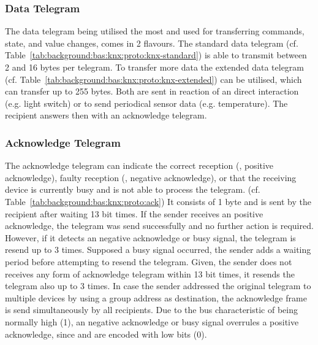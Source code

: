 

\subsubsection{Data Telegram}

The data telegram being utilised the most and used for transferring commands, state, and value changes, comes in 2 flavours.
The standard data telegram (cf. Table~\ref{tab:background:bas:knx:proto:knx-standard}) is able to transmit between 2 and 16 bytes per telegram. To transfer more data the extended data telegram (cf. Table~\ref{tab:background:bas:knx:proto:knx-extended}) can be utilised, which can transfer up to 255 bytes.
Both are sent in reaction of an direct interaction (e.g. light switch) or to send periodical sensor data (e.g. temperature). \parencite{Merz2009}
The recipient answers then with an acknowledge telegram. \parencite{Merz2009,Sokollik2017}





\subsubsection{Acknowledge Telegram}

The acknowledge telegram can indicate the correct reception (, positive acknowledge), faulty reception (, negative acknowledge), or that the receiving device is currently busy and is not able to process the telegram. (cf. Table~\ref{tab:background:bas:knx:proto:ack})
It consists of 1 byte and is sent by the recipient after waiting 13 bit times.
If the sender receives an positive acknowledge, the telegram was send successfully and no further action is required. However, if it detects an negative acknowledge or busy signal, the telegram is resend up to 3 times.
Supposed a busy signal occurred, the sender adds a waiting period before attempting to resend the telegram.
Given, the sender does not receives any form of acknowledge telegram within 13 bit times, it resends the telegram also up to 3 times.
In case the sender addressed the original telegram to multiple devices by using a group address as destination, the acknowledge frame is send simultaneously by all recipients. Due to the bus characteristic of being normally high (1), an negative acknowledge or busy signal overrules a positive acknowledge, since  and  are encoded with low bits (0). \parencite{Merz2009,Sokollik2017}

